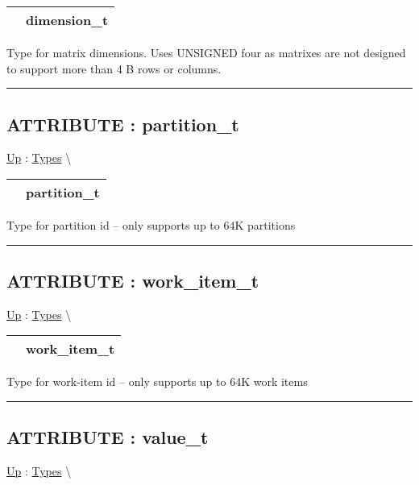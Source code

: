 {\renewcommand{\arraystretch}{1.5}
\begin{tabularx}{\textwidth}{|>{\raggedright\arraybackslash}l|X|}
\hline
\hspace{0pt} & dimension\_t \\
\hline
\end{tabularx}
}

\par
Type for matrix dimensions. Uses UNSIGNED four as matrixes are not designed to support more than 4 B rows or columns.


\rule{\linewidth}{0.5pt}
\subsection*{ATTRIBUTE : partition\_t}
\hypertarget{ecldoc:pbblas.types.partition_t}{}
\hyperlink{ecldoc:PBblas.Types}{Up} :
\hspace{0pt} \hyperlink{ecldoc:PBblas.Types}{Types} \textbackslash 

{\renewcommand{\arraystretch}{1.5}
\begin{tabularx}{\textwidth}{|>{\raggedright\arraybackslash}l|X|}
\hline
\hspace{0pt} & partition\_t \\
\hline
\end{tabularx}
}

\par
Type for partition id -- only supports up to 64K partitions


\rule{\linewidth}{0.5pt}
\subsection*{ATTRIBUTE : work\_item\_t}
\hypertarget{ecldoc:pbblas.types.work_item_t}{}
\hyperlink{ecldoc:PBblas.Types}{Up} :
\hspace{0pt} \hyperlink{ecldoc:PBblas.Types}{Types} \textbackslash 

{\renewcommand{\arraystretch}{1.5}
\begin{tabularx}{\textwidth}{|>{\raggedright\arraybackslash}l|X|}
\hline
\hspace{0pt} & work\_item\_t \\
\hline
\end{tabularx}
}

\par
Type for work-item id -- only supports up to 64K work items


\rule{\linewidth}{0.5pt}
\subsection*{ATTRIBUTE : value\_t}
\hypertarget{ecldoc:pbblas.types.value_t}{}
\hyperlink{ecldoc:PBblas.Types}{Up} :
\hspace{0pt} \hyperlink{ecldoc:PBblas.Types}{Types} \textbackslash 

